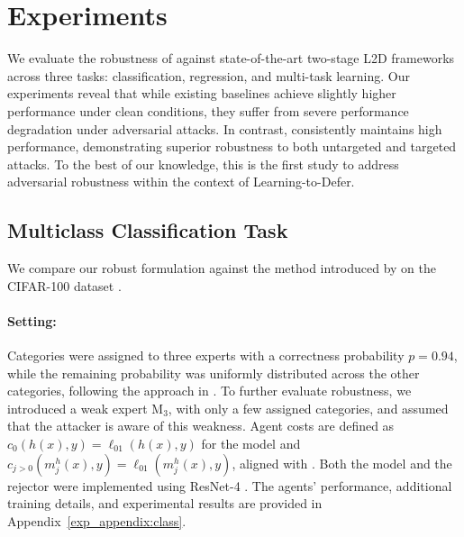 \section{Experiments}
We evaluate the robustness of \name{} against state-of-the-art two-stage L2D frameworks across three tasks: classification, regression, and multi-task learning. Our experiments reveal that while existing baselines achieve slightly higher performance under clean conditions, they suffer from severe performance degradation under adversarial attacks. In contrast, \name{} consistently maintains high performance, demonstrating superior robustness to both untargeted and targeted attacks.  To the best of our knowledge, this is the first study to address adversarial robustness within the context of Learning-to-Defer. 



\subsection{Multiclass Classification Task}
We compare our robust \name{} formulation against the method introduced by \citet{mao2023twostage} on the CIFAR-100 dataset \citep{krizhevsky2009learning}.

\paragraph{Setting:} Categories were assigned to three experts with a correctness probability \( p = 0.94 \), while the remaining probability was uniformly distributed across the other categories, following the approach in \citep{mozannar2021consistent, Verma2022LearningTD, Cao_Mozannar_Feng_Wei_An_2023}. To further evaluate robustness, we introduced a weak expert  M\(_3 \), with only a few assigned categories, and assumed that the attacker is aware of this weakness. Agent costs are defined as \( c_0(h(x), y) = \ell_{01}(h(x), y) \) for the model and \( c_{j > 0}(m_j^h(x), y) = \ell_{01}(m_j^h(x), y) \), aligned with \citep{mozannar2021consistent, Mozannar2023WhoSP, Verma2022LearningTD, Cao_Mozannar_Feng_Wei_An_2023, mao2023twostage}.  Both the model and the rejector were implemented using ResNet-4 \citep{he2015deepresiduallearningimage}. The agents' performance, additional training details, and experimental results are provided in Appendix~\ref{exp_appendix:class}. 



